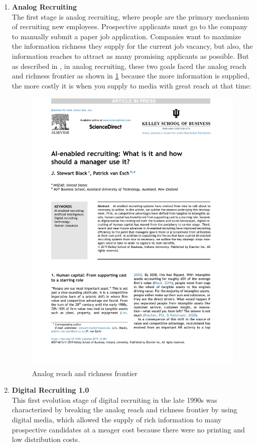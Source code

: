 \documentclass[draft,final]{thesisclass} %
\begin{document}
\begin{enumerate}
    \item \textbf{Analog Recruiting} \label{analog_recruting}\\
    The first stage is analog recruiting, where people are the primary mechanism of recruiting new employees.
    Prospective applicants must go to the company to manually submit a paper job application.
    Companies want to maximize the information richness they supply for the current job vacancy, but also, the information reaches to attract as many promising applicants as possible.
    But as described in \textcite[2]{ai_recruiting}, in analog recruiting, these two goals faced the analog reach and richness frontier as shown in \ref{fig:analog_reach_richness_frontier} because the more information is supplied, the more costly it is when you supply to media with great reach at that time:
    \begin{figure}[H]
        \centering
        \includegraphics[scale=0.5,page=2,width=0.6\linewidth,trim={300 100 55 515},clip]{literature/ai_recruiting.pdf}
        \caption{Analog reach and richness frontier \parencite[2]{ai_recruiting}}
        \label{fig:analog_reach_richness_frontier}
    \end{figure}
    \item \textbf{Digital Recruiting 1.0} \label{digital_recruiting_1}\\
    This first evolution stage of digital recruiting in the late 1990s was characterized by breaking the analog reach and richness frontier by using digital media, which allowed the supply of rich information to many prospective candidates at a meager cost because there were no printing and low distribution costs.

\end{enumerate}
\end{document}
